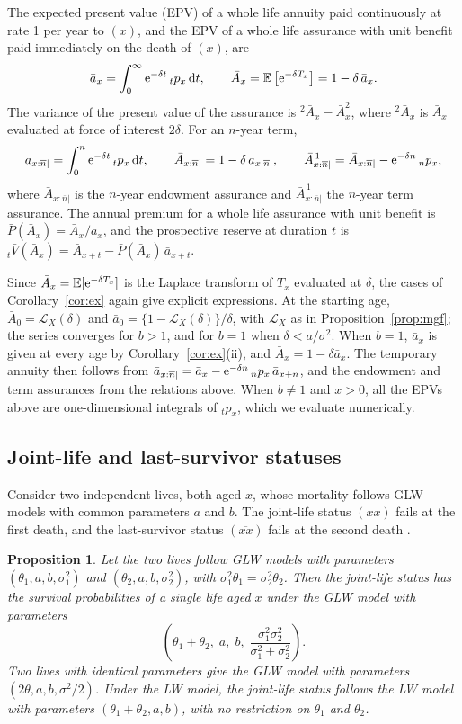 \documentclass[12pt]{article}
\newcommand{\E}{\mathbb{E}}       %
\newcommand{\e}{{\rm e}}         %
\newcommand{\dd}{{\rm d}}        %
\newtheorem{proposition}{Proposition}
\begin{document}
The expected present value (EPV) of a whole life annuity paid continuously at rate 1 per year to $(x)$, and the EPV of a whole life assurance with unit benefit paid immediately on the death of $(x)$, are
\[
\bar{a}_x=\int_0^\infty\e^{-\delta t}\,{}_tp_x\,\dd t,
\qquad
\bar{A}_x=\E\left[\e^{-\delta T_x}\right]=1-\delta\,\bar{a}_x.
\]
The variance of the present value of the assurance is ${}^2\bar{A}_x-\bar{A}_x^2$, where ${}^2\bar{A}_x$ is $\bar{A}_x$ evaluated at force of interest $2\delta$. For an $n$-year term,
\[
\bar{a}_{x:\overline{n}|}=\int_0^n\e^{-\delta t}\,{}_tp_x\,\dd t,
\qquad
\bar{A}_{x:\overline{n}|}=1-\delta\,\bar{a}_{x:\overline{n}|},
\qquad
\bar{A}^{\,1}_{x:\overline{n}|}=\bar{A}_{x:\overline{n}|}-\e^{-\delta n}\,{}_np_x,
\]
where $\bar{A}_{x:\overline{n}|}$ is the $n$-year endowment assurance and $\bar{A}^{\,1}_{x:\overline{n}|}$ the $n$-year term assurance. The annual premium for a whole life assurance with unit benefit is $\bar{P}(\bar{A}_x)=\bar{A}_x/\bar{a}_x$, and the prospective reserve at duration $t$ is ${}_t\bar{V}(\bar{A}_x)=\bar{A}_{x+t}-\bar{P}(\bar{A}_x)\,\bar{a}_{x+t}$.

Since $\bar{A}_x=\E[\e^{-\delta T_x}]$ is the Laplace transform of $T_x$ evaluated at $\delta$, the cases of Corollary~\ref{cor:ex} again give explicit expressions. At the starting age, $\bar{A}_0=\mathcal{L}_X(\delta)$ and $\bar{a}_0=\{1-\mathcal{L}_X(\delta)\}/\delta$, with $\mathcal{L}_X$ as in Proposition~\ref{prop:mgf}; the series converges for $b>1$, and for $b=1$ when $\delta<a/\sigma^2$. When $b=1$, $\bar{a}_x$ is given at every age by Corollary~\ref{cor:ex}(ii), and $\bar{A}_x=1-\delta\bar{a}_x$. The temporary annuity then follows from $\bar{a}_{x:\overline{n}|}=\bar{a}_x-\e^{-\delta n}\,{}_np_x\,\bar{a}_{x+n}$, and the endowment and term assurances from the relations above. When $b\neq1$ and $x>0$, all the EPVs above are one-dimensional integrals of ${}_tp_x$, which we evaluate numerically.

\subsection{Joint-life and last-survivor statuses}

Consider two independent lives, both aged $x$, whose mortality follows GLW models with common parameters $a$ and $b$. The joint-life status $(xx)$ fails at the first death, and the last-survivor status $(\overline{xx})$ fails at the second death \citep[Chapter~7]{neill1977life}.

\begin{proposition}\label{prop:joint}
Let the two lives follow GLW models with parameters $(\theta_1,a,b,\sigma_1^2)$ and $(\theta_2,a,b,\sigma_2^2)$, with $\sigma_1^2\theta_1=\sigma_2^2\theta_2$. Then the joint-life status has the survival probabilities of a single life aged $x$ under the GLW model with parameters
\[
\left(\theta_1+\theta_2,\;a,\;b,\;\frac{\sigma_1^2\sigma_2^2}{\sigma_1^2+\sigma_2^2}\right).
\]
Two lives with identical parameters give the GLW model with parameters $(2\theta,a,b,\sigma^2/2)$. Under the LW model, the joint-life status follows the LW model with parameters $(\theta_1+\theta_2,a,b)$, with no restriction on $\theta_1$ and $\theta_2$.
\end{proposition}
\end{document}
